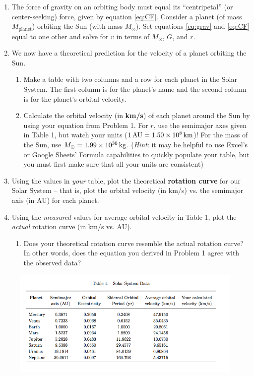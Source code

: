 \documentclass[11pt]{article}%
\begin{document}
\begin{enumerate}
    \item The force of gravity on an orbiting body must equal its ``centripetal'' (or center-seeking) force, given by equation \ref{eq:CF}. Consider a planet (of mass $M_{\textrm{planet}}$) orbiting the Sun (with mass $M_\odot$). Set equations \ref{eq:grav} and \ref{eq:CF} equal to one other and solve for $v$ in terms of $M_{\odot}$, $G$, and $r$.
    
    \item We now have a theoretical prediction for the velocity of a planet orbiting the Sun.
    \begin{enumerate}
        \item Make a table with two columns and a row for each planet in the Solar System. The first column is for the planet's name and the second column is for the planet's orbital velocity. 
        
        \item Calculate the orbital velocity (in \textbf{km/s}) of each planet around the Sun by using your equation from Problem 1. For $r$, use the semimajor axes given in Table 1, but watch your units ($1 \, {\rm AU} = 1.50 \times 10^8 \, {\rm km}$)! For the mass of the Sun, use $M_\odot = 1.99 \times 10^{30} \, {\rm kg}$. (\emph{Hint}: it may be helpful to use Excel's or Google Sheets' Formula capabilities to quickly populate your table, but you must first make sure that all your units are consistent)
    \end{enumerate}
    
    \item Using the values in \emph{your} table, plot the theoretical \textbf{rotation curve} for our Solar System -- that is, plot the orbital velocity (in km/s) vs. the semimajor axis (in AU) for each planet. 
    
    \item Using the \emph{measured} values for average orbital velocity in Table 1, plot the \emph{actual} rotation curve (in km/s vs. AU). 
    \begin{enumerate}
        \item Does your theoretical rotation curve resemble the actual rotation curve? In other words, does the equation you derived in Problem 1 agree with the observed data?
    \end{enumerate}
\end{enumerate}

\begin{figure}[h!] \label{tab:planets}
\center
\includegraphics[scale=0.55]{table1.png}
\label{table1}
\end{figure}
\end{document}
